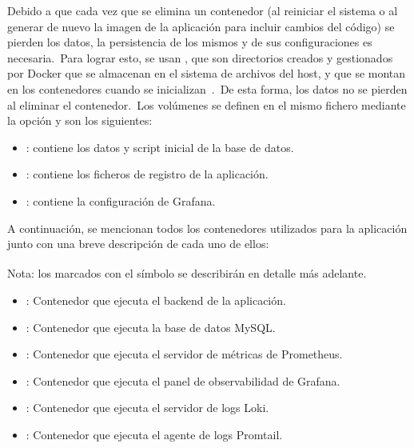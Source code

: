 Debido a que cada vez que se elimina un contenedor (al reiniciar el sistema o al generar de nuevo la imagen de la
aplicación para incluir cambios del código) se pierden los datos, la persistencia de los mismos y de sus
configuraciones es necesaria.\ Para lograr esto, se usan , que son directorios creados y
gestionados por Docker que se almacenan en el sistema de archivos del host, y que se montan en los contenedores cuando
se inicializan~\cite{docker-volumes}.\ De esta forma, los datos no se pierden al eliminar el contenedor.\ Los
volúmenes se definen en el mismo fichero  mediante la opción  y son
los siguientes:

\begin{itemize}
	\item {}: contiene los datos y script inicial de la base de datos.
	\item {}: contiene los ficheros de registro de la aplicación.
	\item {}: contiene la configuración de Grafana.
\end{itemize}

A continuación, se mencionan todos los contenedores utilizados para la aplicación junto con una breve descripción de
cada uno de ellos:

	{\scriptsize Nota: los marcados con el símbolo \textsuperscript{\textasteriskcentered} se describirán en detalle
más adelante.}

\begin{itemize}
	\item {}: Contenedor que ejecuta el backend de la aplicación.
	\item {}: Contenedor que ejecuta la base de datos MySQL\@.
	\item {}: Contenedor que ejecuta el servidor de métricas
	de Prometheus.
	\item {}: Contenedor que ejecuta el panel de observabilidad
	de Grafana.
	\item {}: Contenedor que ejecuta el servidor de logs Loki.
	\item {}: Contenedor que ejecuta el agente de logs
	Promtail.
\end{itemize}
\label{itm:docker-compose-services}

